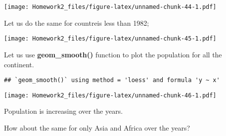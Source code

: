 \documentclass[]{article}
\newenvironment{Shaded}{\begin{snugshade}}{\end{snugshade}}
\newcommand{\KeywordTok}[1]{\textcolor[rgb]{0.13,0.29,0.53}{\textbf{{#1}}}}
\newcommand{\DataTypeTok}[1]{\textcolor[rgb]{0.13,0.29,0.53}{{#1}}}
\newcommand{\FloatTok}[1]{\textcolor[rgb]{0.00,0.00,0.81}{{#1}}}
\newcommand{\StringTok}[1]{\textcolor[rgb]{0.31,0.60,0.02}{{#1}}}
\newcommand{\CommentTok}[1]{\textcolor[rgb]{0.56,0.35,0.01}{\textit{{#1}}}}
\newcommand{\NormalTok}[1]{{#1}}
\begin{document}
\texttt{[image: Homework2\_files/figure-latex/unnamed-chunk-44-1.pdf]}

Let us do the same for countreis less than 1982;

\begin{Shaded}
\end{Shaded}

\texttt{[image: Homework2\_files/figure-latex/unnamed-chunk-45-1.pdf]}

Let us use \textbf{geom\_smooth()} function to plot the population for
all the continent.

\begin{Shaded}
\end{Shaded}

\begin{verbatim}
## `geom_smooth()` using method = 'loess' and formula 'y ~ x'
\end{verbatim}

\texttt{[image: Homework2\_files/figure-latex/unnamed-chunk-46-1.pdf]}

Population is increasing over the years.

How about the same for only Asia and Africa over the years?

\begin{Shaded}
\end{Shaded}
\end{document}
